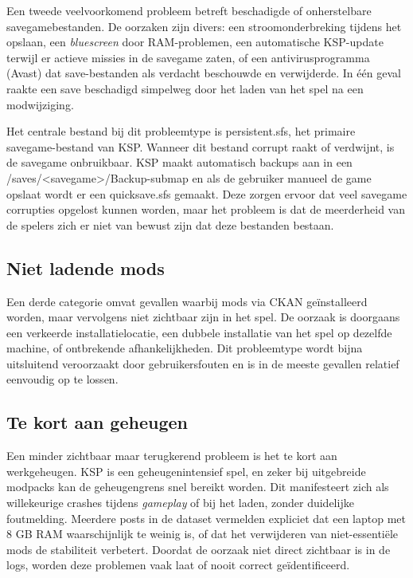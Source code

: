 Een tweede veelvoorkomend probleem betreft beschadigde of onherstelbare savegamebestanden. De oorzaken zijn divers: een stroomonderbreking tijdens het opslaan, een \textit{bluescreen} door RAM-problemen, een automatische KSP-update terwijl er actieve missies in de savegame zaten, of een antivirusprogramma (Avast) dat save-bestanden als verdacht beschouwde en verwijderde. In één geval raakte een save beschadigd simpelweg door het laden van het spel na een modwijziging.

Het centrale bestand bij dit probleemtype is persistent.sfs, het primaire savegame-bestand van KSP. Wanneer dit bestand corrupt raakt of verdwijnt, is de savegame onbruikbaar. KSP maakt automatisch backups aan in een /saves/<savegame>/Backup-submap en als de gebruiker manueel de game opslaat wordt er een quicksave.sfs gemaakt. Deze zorgen ervoor dat veel savegame corrupties opgelost kunnen worden, maar het probleem is dat de meerderheid van de spelers zich er niet van bewust zijn dat deze bestanden bestaan.

\subsection{Niet ladende mods}

Een derde categorie omvat gevallen waarbij mods via CKAN geïnstalleerd worden, maar vervolgens niet zichtbaar zijn in het spel. De oorzaak is doorgaans een verkeerde installatielocatie, een dubbele installatie van het spel op dezelfde machine, of ontbrekende afhankelijkheden. Dit probleemtype wordt bijna uitsluitend veroorzaakt door gebruikersfouten en is in de meeste gevallen relatief eenvoudig op te lossen.

\subsection{Te kort aan geheugen}

Een minder zichtbaar maar terugkerend probleem is het te kort aan werkgeheugen. KSP is een geheugenintensief spel, en zeker bij uitgebreide modpacks kan de geheugengrens snel bereikt worden. Dit manifesteert zich als willekeurige crashes tijdens \textit{gameplay} of bij het laden, zonder duidelijke foutmelding. Meerdere posts in de dataset vermelden expliciet dat een laptop met 8 GB RAM waarschijnlijk te weinig is, of dat het verwijderen van niet-essentiële mods de stabiliteit verbetert. Doordat de oorzaak niet direct zichtbaar is in de logs, worden deze problemen vaak laat of nooit correct geïdentificeerd.

